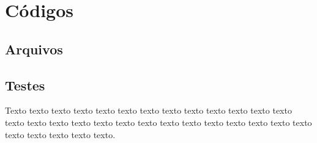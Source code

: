 \chapter{Códigos}
\label{cap:code}

\section{Arquivos}
\label{sec:files}

\section{Testes}
\label{sec:tests}

Texto texto texto texto texto texto texto texto texto texto texto texto texto
texto texto texto texto texto texto texto texto texto texto texto texto texto
texto texto texto texto texto texto.
